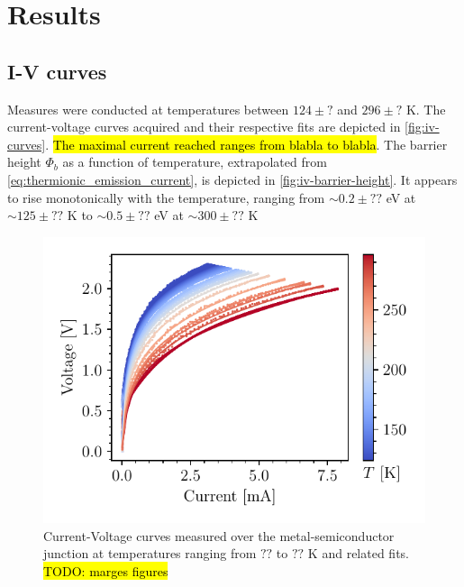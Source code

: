 \section{Results}
\subsection{I-V curves}
Measures were conducted at temperatures between $124 \pm ?$ and $296\pm?$ K. 
The current-voltage curves acquired and their respective fits are depicted in \autoref{fig:iv-curves}.
\hl{The maximal current reached ranges from blabla to blabla}.
The barrier height $\Phi_b$ as a function of temperature, extrapolated from \autoref{eq:thermionic_emission_current}, is depicted in \autoref{fig:iv-barrier-height}.
It appears to rise monotonically with the temperature, ranging from $\sim 0.2 \pm ??$ eV at $\sim 125 \pm ??$ K to $\sim 0.5 \pm ??$ eV at $\sim 300 \pm ??$ K

\begin{figure}[htbp]
    \centering
    \includegraphics[scale=1]{figures/iv-curves.pdf}
    \caption{Current-Voltage curves measured over the metal-semiconductor junction at temperatures ranging from $??$ to $??$ K and related fits. \hl{TODO: marges figures}}
    \label{fig:iv-curves}
\end{figure}

